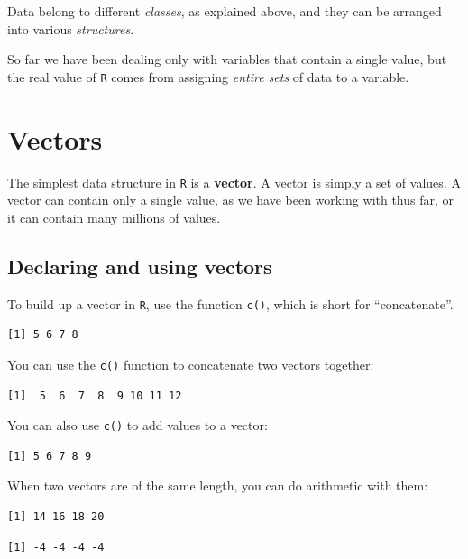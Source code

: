 \documentclass[
]{book}
\begin{document}
Data belong to different \emph{classes}, as explained above, and they can be arranged into various \emph{structures}.

So far we have been dealing only with variables that contain a single value, but the real value of \texttt{R} comes from assigning \emph{entire sets} of data to a variable.

\hypertarget{vectors}{%
\section*{Vectors}\label{vectors}}

The simplest data structure in \texttt{R} is a \textbf{vector}. A vector is simply a set of values. A vector can contain only a single value, as we have been working with thus far, or it can contain many millions of values.

\hypertarget{declaring-and-using-vectors}{%
\subsection*{Declaring and using vectors}\label{declaring-and-using-vectors}}

To build up a vector in \texttt{R}, use the function \texttt{c()}, which is short for ``concatenate''.

\begin{verbatim}
[1] 5 6 7 8
\end{verbatim}

You can use the \texttt{c()} function to concatenate two vectors together:

\begin{verbatim}
[1]  5  6  7  8  9 10 11 12
\end{verbatim}

You can also use \texttt{c()} to add values to a vector:

\begin{verbatim}
[1] 5 6 7 8 9
\end{verbatim}

When two vectors are of the same length, you can do arithmetic with them:

\begin{verbatim}
[1] 14 16 18 20
\end{verbatim}

\begin{verbatim}
[1] -4 -4 -4 -4
\end{verbatim}
\end{document}
